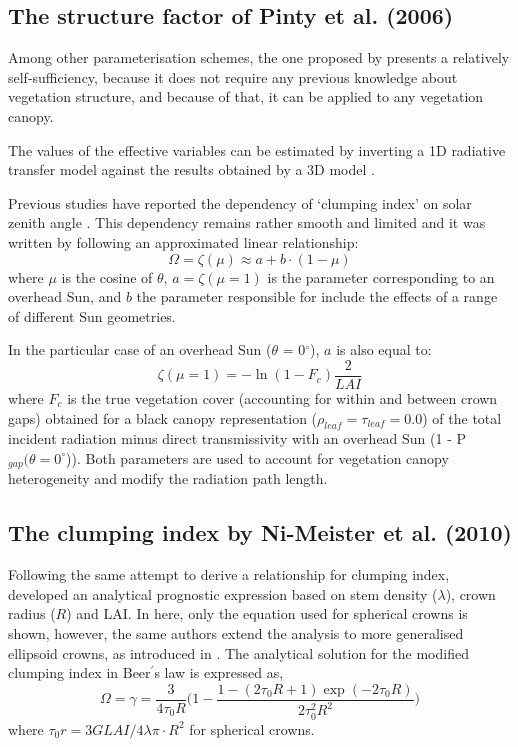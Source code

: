 \subsection{The structure factor of Pinty et al. (2006)}
Among other parameterisation schemes, the one proposed by \citet{pinty2006} presents a relatively self-sufficiency, because it does not require any previous knowledge about vegetation structure, and because of that, it can be applied to any vegetation canopy. 

The values of the effective variables can be estimated by inverting a 1D radiative transfer model against the results obtained by a 3D model \citep{pinty2006}.

Previous studies have reported the dependency of `clumping index' on solar zenith angle \citep{Andrieu1993,Chen1996,Kucharik1999,Leblanc2005,Ryu2010}. This dependency remains rather smooth and limited \citep{Chen1997a,Chen1997} and it was written by \citet{pinty2006} following an approximated linear relationship:
\begin{equation}
\Omega = \zeta(\mu) \approx a + b \cdot (1 - \mu)
\label{equation:structurefactor}
\end{equation}
\noindent where $\mu$ is the cosine of $\theta$, $a = \zeta(\mu=1)$ is the parameter corresponding to an overhead Sun, and $b$ the parameter responsible for include the effects of a range of different Sun geometries.

In the particular case of an overhead Sun ($\theta$ = 0$^{\circ}$), $a$ is also equal to:
 \begin{equation}
\zeta(\mu=1) = -\ln{(1 - F_c)}\frac{2}{LAI}
\label{equation:structurefactora}
\end{equation}
\noindent where $F_c$ is the true vegetation cover (accounting for within and between crown gaps) obtained for a black canopy representation ($\rho_{leaf} = \tau_{leaf} = 0.0$) of the total incident radiation minus direct transmissivity with an overhead Sun (1 - P$_{gap}(\theta = 0^{\circ}$)).
Both parameters are used to account for vegetation canopy heterogeneity and modify the radiation path length. 

\subsection{The clumping index by Ni-Meister et al. (2010)}
Following the same attempt to derive a relationship for clumping index, \citet{Ni-Meister2010} developed an analytical prognostic expression based on stem density ($\lambda$), crown radius ($R$) and LAI. In here, only the equation used for spherical crowns is shown, however, the same authors extend the analysis to more generalised ellipsoid crowns, as introduced in \citet{Li1988}. The analytical solution for the modified clumping index in Beer$^{\prime}$s law is expressed as, 
\begin{equation}
\Omega = \gamma = \frac{3}{4\tau_0R}\Big(1 - \frac{1 - (2\tau_0R + 1)\exp(-2\tau_0R)}{2\tau_0^2R^2}\Big)
\label{equation:clumpNi}
\end{equation}
\noindent where $\tau_0r = 3 G LAI/ 4 \lambda \pi \cdot R^2$ for spherical crowns. 

